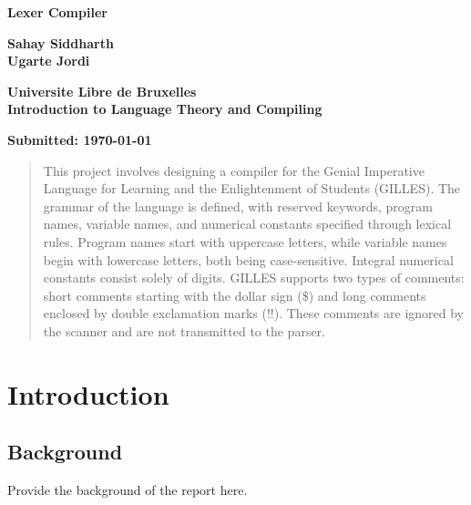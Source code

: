 \documentclass[12pt,a4paper]{report}
\begin{document}
	
	\begin{titlepage}
		\centering
		\vspace*{2cm}
		
		\Huge
		\textbf{Lexer Compiler}
		
		\vspace{1.5cm}
		
		\Large
		\textbf{Sahay Siddharth} \\
		\textbf{Ugarte Jordi}		
		
		\vfill
		
		\Large
		\textbf{Universite Libre de Bruxelles} \\
		\textbf{Introduction to Language Theory and Compiling}
		
		\vspace{0.8cm}
		
		\large
		\textbf{Submitted: \today}
		
		\vfill
	\end{titlepage}
	
	\begin{abstract}
		This project involves designing a compiler for the Genial Imperative Language for Learning and the Enlightenment of Students (GILLES). The grammar of the language is defined, with reserved keywords, program names, variable names, and numerical constants specified through lexical rules. Program names start with uppercase letters, while variable names begin with lowercase letters, both being case-sensitive. Integral numerical constants consist solely of digits. GILLES supports two types of comments: short comments starting with the dollar sign (\$) and long comments enclosed by double exclamation marks (!!). These comments are ignored by the scanner and are not transmitted to the parser.
	\end{abstract}

	
	\tableofcontents
	\newpage
	
	\listoffigures
	\newpage
	
	\listoftables
	\newpage
	
	\chapter{Introduction}
	\section{Background}
	Provide the background of the report here.
\end{document}
